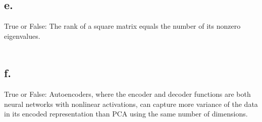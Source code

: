 \documentclass{article}
\newcommand{\1}{\mathbf{1}}
\begin{document}
{\subsection*{e.}

True or False: The rank of a square matrix equals the number of its nonzero eigenvalues. \\ \\



\subsection*{f.}

True or False: Autoencoders, where the encoder and decoder functions are both neural networks with nonlinear activations, can capture more variance of the data in its encoded representation than PCA using the same number of dimensions. \\ \\



}
\end{document}
